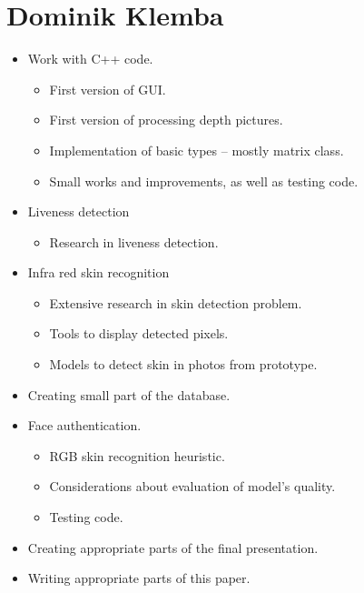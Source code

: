    \section{Dominik Klemba}
        \begin{itemize}
            \item Work with C++ code.
            \begin{itemize}
                \item First version of GUI.
                \item First version of processing depth pictures.
                \item Implementation of basic types -- mostly matrix class.
                \item Small works and improvements, as well as testing code.
            \end{itemize}
            \item Liveness detection
            \begin{itemize}
                \item Research in liveness detection.
            \end{itemize}
            \item Infra red skin recognition
            \begin{itemize}
                \item Extensive research in skin detection problem.
                \item Tools to display detected pixels.
                \item Models to detect skin in photos from prototype.
            \end{itemize}
            \item Creating small part of the database.
            \item Face authentication.
            \begin{itemize}
                \item RGB skin recognition heuristic.
                \item Considerations about evaluation of model's quality.
                \item Testing code.
            \end{itemize}
            \item Creating appropriate parts of the final presentation.
            \item Writing appropriate parts of this paper.
        \end{itemize}

